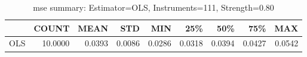 \begin{table}[ht]
\centering
\caption{mse summary: Estimator=OLS, Instruments=111, Strength=0.80}
\begin{tabular}{lrrrrrrrr}
\toprule
 & COUNT & MEAN & STD & MIN & 25\% & 50\% & 75\% & MAX \\
\midrule
OLS & 10.0000 & 0.0393 & 0.0086 & 0.0286 & 0.0318 & 0.0394 & 0.0427 & 0.0542 \\
\bottomrule
\end{tabular}
\end{table}
